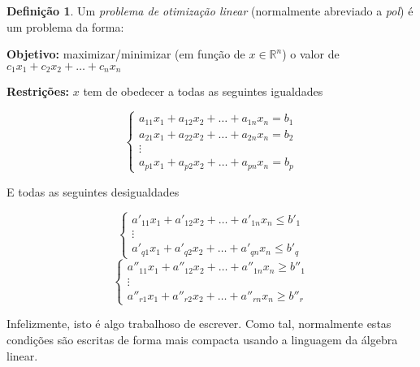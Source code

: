 \documentclass{article}
\newcommand{\R}{\mathbb{R}}
\theoremstyle{definition}
\newtheorem{definition}{Definição}
\begin{document}
	\begin{definition}
	Um \emph{problema de otimização linear} (normalmente abreviado a \emph{pol}) é um problema da forma:
	
	\smallskip
	
	\textbf{Objetivo: } maximizar/minimizar (em função de $x \in \R^n$) o valor de ${c_1 x_1 + c_2 x_2 + \ldots + c_n x_n}$
	
	\smallskip
	
	\textbf{Restrições: } $x$ tem de obedecer a todas as seguintes igualdades

\[
\begin{cases}
	a_{11} x_1 + a_{12} x_2 + \ldots + a_{1n} x_n = b_1 \\ 
	a_{21} x_1 + a_{22} x_2 + \ldots + a_{2n} x_n = b_2 \\
	\vdots \\
	a_{p1} x_1 + a_{p2} x_2 + \ldots + a_{pn} x_n = b_p
\end{cases}
\]

E todas as seguintes desigualdades

\[
\begin{cases}
	a'_{11} x_1 + a'_{12} x_2 + \ldots + a'_{1n} x_n \leq b'_1 \\ 
	\vdots \\
	a'_{q1} x_1 + a'_{q2} x_2 + \ldots + a'_{qn} x_n \leq b'_q
\end{cases}
\]
\[
\begin{cases}
	a''_{11} x_1 + a''_{12} x_2 + \ldots + a''_{1n} x_n \geq b''_1 \\ 
	\vdots \\
	a''_{r1} x_1 + a''_{r2} x_2 + \ldots + a''_{rn} x_n \geq b''_r
\end{cases}
\]
	\end{definition}
	
	Infelizmente, isto é algo trabalhoso de escrever. Como tal, normalmente estas condições são escritas de forma mais compacta usando a linguagem da álgebra linear.
	
\end{document}
